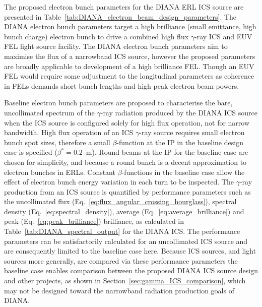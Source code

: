 \documentclass[../main.tex]{subfiles}
\begin{document}
The proposed electron bunch parameters for the DIANA ERL ICS source are presented in Table~\ref{tab:DIANA_electron_beam_design_parameters}. The DIANA electron bunch parameters target a high brilliance (small emittance, high bunch charge) electron bunch to drive a combined high flux $\gamma$-ray ICS and EUV FEL light source facility. The DIANA electron bunch parameters aim to maximise the flux of a narrowband ICS source, however the proposed parameters are broadly applicable to development of a high brilliance FEL. Though an EUV FEL would require some adjustment to the longitudinal parameters as coherence in FELs demands short bunch lengths and high peak electron beam powers. 

Baseline electron bunch parameters are proposed to characterise the bare, uncollimated spectrum of the $\gamma$-ray radiation produced by the DIANA ICS source when the ICS source is configured solely for high flux operation, not for narrow bandwidth. High flux operation of an ICS $\gamma$-ray source requires small electron bunch spot sizes, therefore a small $\beta$-function at the IP in the baseline design case is specified ($\beta^{*}=0.2$~\si{\meter}). Round beams at the IP for the baseline case are chosen for simplicity, and because a round bunch is a decent approximation to electron bunches in ERLs. Constant $\beta$-functions in the baseline case allow the effect of electron bunch energy variation in each turn to be inspected. The $\gamma$-ray production from an ICS source is quantified by performance parameters such as the uncollimated flux (Eq.~\ref{eq:flux_angular_crossing_hourglass}), spectral density (Eq.~\ref{eq:spectral_density}), average (Eq.~\ref{eq:average_brilliance}) and peak (Eq.~\ref{eq:peak_brilliance}) brilliance, as calculated in Table~\ref{tab:DIANA_spectral_output} for the DIANA ICS. The performance parameters can be satisfactorily calculated for an uncollimated ICS source and are consequently limited to the baseline case here. Because ICS sources, and light sources more generally, are compared via these performance parameters the baseline case enables comparison between the proposed DIANA ICS source design and other projects, as shown in Section~\ref{sec:gamma_ICS_comparison}, which may not be designed toward the narrowband radiation production goals of DIANA.
\end{document}
